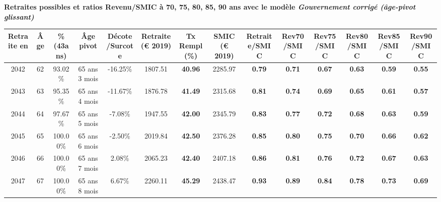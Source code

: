  \vspace{0.1cm} 
{\bf \noindent Retraites possibles et ratios Revenu/SMIC à 70, 75, 80, 85, 90 ans avec le modèle \emph{Gouvernement corrigé (âge-pivot glissant)}}  
 
\begin{adjustbox}{max width=\textwidth} 
\begin{tabular}[htb]{|c|c||c|c|c||c|c||c||c|c|c|c|c|c|} 
\hline 
 Retraite en &  Âge &  \%(43ans) &  Âge pivot &  Décote/Surcote &  Retraite (\euro{} 2019) &  Tx Rempl(\%) &  SMIC (\euro{} 2019) &  Retraite/SMIC &  Rev70/SMIC &  Rev75/SMIC &  Rev80/SMIC &  Rev85/SMIC &  Rev90/SMIC \\ 
\hline \hline 
 2042 &  62 &  93.02\% &  65 ans 3 mois &  -16.25\% &  1807.51 &  {\bf 40.96} &  2285.97 &  {\bf {\color{red} 0.79}} &  {\bf {\color{red} 0.71}} &  {\bf {\color{red} 0.67}} &  {\bf {\color{red} 0.63}} &  {\bf {\color{red} 0.59}} &  {\bf {\color{red} 0.55}} \\ 
\hline 
 2043 &  63 &  95.35\% &  65 ans 4 mois &  -11.67\% &  1876.78 &  {\bf 41.49} &  2315.68 &  {\bf {\color{red} 0.81}} &  {\bf {\color{red} 0.74}} &  {\bf {\color{red} 0.69}} &  {\bf {\color{red} 0.65}} &  {\bf {\color{red} 0.61}} &  {\bf {\color{red} 0.57}} \\ 
\hline 
 2044 &  64 &  97.67\% &  65 ans 5 mois &  -7.08\% &  1947.55 &  {\bf 42.00} &  2345.79 &  {\bf {\color{red} 0.83}} &  {\bf {\color{red} 0.77}} &  {\bf {\color{red} 0.72}} &  {\bf {\color{red} 0.68}} &  {\bf {\color{red} 0.63}} &  {\bf {\color{red} 0.59}} \\ 
\hline 
 2045 &  65 &  100.00\% &  65 ans 6 mois &  -2.50\% &  2019.84 &  {\bf 42.50} &  2376.28 &  {\bf {\color{red} 0.85}} &  {\bf {\color{red} 0.80}} &  {\bf {\color{red} 0.75}} &  {\bf {\color{red} 0.70}} &  {\bf {\color{red} 0.66}} &  {\bf {\color{red} 0.62}} \\ 
\hline 
 2046 &  66 &  100.00\% &  65 ans 7 mois &  2.08\% &  2065.23 &  {\bf 42.40} &  2407.18 &  {\bf {\color{red} 0.86}} &  {\bf {\color{red} 0.81}} &  {\bf {\color{red} 0.76}} &  {\bf {\color{red} 0.72}} &  {\bf {\color{red} 0.67}} &  {\bf {\color{red} 0.63}} \\ 
\hline 
 2047 &  67 &  100.00\% &  65 ans 8 mois &  6.67\% &  2260.11 &  {\bf 45.29} &  2438.47 &  {\bf {\color{red} 0.93}} &  {\bf {\color{red} 0.89}} &  {\bf {\color{red} 0.84}} &  {\bf {\color{red} 0.78}} &  {\bf {\color{red} 0.73}} &  {\bf {\color{red} 0.69}} \\ 
\hline 
\hline 
\end{tabular} 
\end{adjustbox} 
 
